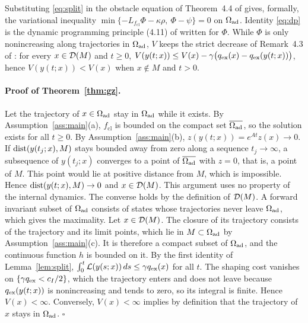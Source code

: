 Substituting \eqref{eq:split} in the obstacle equation of Theorem~4.4 of \citet{gruene2015} gives, formally, the variational inequality $\min\{-L_{f_{\mathrm{cl}}}\Phi-\kappa\rho,\ \Phi-\psi\}=0$ on $\Omega_{\mathrm{ad}}$. Identity \eqref{eq:dp} is the dynamic programming principle (4.11) of \citet{gruene2015} written for $\Phi$. While $\Phi$ is only nonincreasing along trajectories in $\Omega_{\mathrm{ad}}$, $V$ keeps the strict decrease of Remark~4.3 of \citet{gruene2015}: for every $x\in\mathcal D(M)$ and $t\ge0$, $V(y(t;x))\le V(x)-\gamma\big(q_{\mathrm{ex}}(x)-q_{\mathrm{ex}}(y(t;x))\big)$, hence $V(y(t;x))<V(x)$ when $x\notin M$ and $t>0$.

\paragraph{Proof of Theorem~\ref{thm:gz}.} Let the trajectory of $x\in\Omega_{\mathrm{ad}}$ stay in $\Omega_{\mathrm{ad}}$ while it exists. By Assumption~\ref{ass:main}(a), $f_{\mathrm{cl}}$ is bounded on the compact set $\overline{\Omega_{\mathrm{ad}}}$, so the solution exists for all $t\ge0$. By Assumption~\ref{ass:main}(b), $z(y(t;x))=e^{At}z(x)\to0$. If $\operatorname{dist}(y(t_j;x),M)$ stays bounded away from zero along a sequence $t_j\to\infty$, a subsequence of $y(t_j;x)$ converges to a point of $\overline{\Omega_{\mathrm{ad}}}$ with $z=0$, that is, a point of $M$. This point would lie at positive distance from $M$, which is impossible. Hence $\operatorname{dist}(y(t;x),M)\to0$ and $x\in\mathcal D(M)$. This argument uses no property of the internal dynamics. The converse holds by the definition of $\mathcal D(M)$. A forward invariant subset of $\Omega_{\mathrm{ad}}$ consists of states whose trajectories never leave $\Omega_{\mathrm{ad}}$, which gives the maximality. Let $x\in\mathcal D(M)$. The closure of its trajectory consists of the trajectory and its limit points, which lie in $M\subset\Omega_{\mathrm{ad}}$ by Assumption~\ref{ass:main}(c). It is therefore a compact subset of $\Omega_{\mathrm{ad}}$, and the continuous function $h$ is bounded on it. By the first identity of Lemma~\ref{lem:split}, $\int_0^t\mathcal L(y(s;x))\,ds\le\gamma q_{\mathrm{ex}}(x)$ for all $t$. The shaping cost vanishes on $\{\gamma q_{\mathrm{ex}}<c_I/2\}$, which the trajectory enters and does not leave because $q_{\mathrm{ex}}(y(t;x))$ is nonincreasing and tends to zero, so its integral is finite. Hence $V(x)<\infty$. Conversely, $V(x)<\infty$ implies by definition that the trajectory of $x$ stays in $\Omega_{\mathrm{ad}}$. \hfill$\square$

